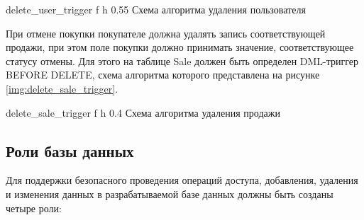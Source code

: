     {delete_user_trigger}
    {f}
    {h}
    {0.55\textwidth}
    {Схема алгоритма удаления пользователя}
    
При отмене покупки покупателе должна удалять запись соответствующей продажи, при этом поле покупки должно принимать значение, соответствующее статусу отмены. Для этого на таблице Sale должен быть определен DML-триггер BEFORE DELETE, схема алгоритма которого представлена на рисунке \ref{img:delete_sale_trigger}.

    {delete_sale_trigger}
    {f}
    {h}
    {0.4\textwidth}
    {Схема алгоритма удаления продажи}

\subsection{Роли базы данных}

Для поддержки безопасного проведения операций доступа, добавления, удаления и изменения данных в разрабатываемой базе данных должны быть созданы четыре роли:

